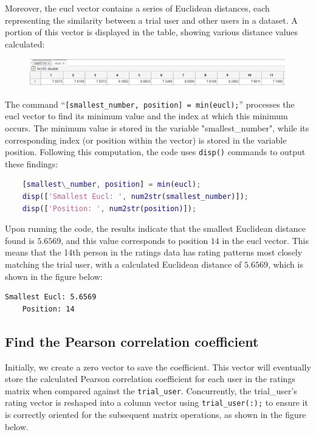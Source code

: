Moreover, the eucl vector contains a series of Euclidean distances, each representing the similarity between a trial user and other users in a dataset. A portion of this vector is displayed in the table, showing various distance values calculated:

\begin{figure}[H]
	\centering
	\includegraphics[width=\linewidth]{sections/pic/section3/3.png}
\end{figure}

The command “\texttt{[smallest\_number, position] = min(eucl);}” processes the eucl vector to find its minimum value and the index at which this minimum occurs. The minimum value is stored in the variable "smallest\_number", while its corresponding index (or position within the vector) is stored in the variable position. Following this computation, the code uses \texttt{disp()} commands to output these findings:

\begin{lstlisting}[style=StyleCode, language=MATLAB]
	% Find the smallest Euclidean distance
	[smallest\_number, position] = min(eucl);
	disp(['Smallest Eucl: ', num2str(smallest_number)]);
	disp(['Position: ', num2str(position)]);
\end{lstlisting}

Upon running the code, the results indicate that the smallest Euclidean distance found is $5.6569$, and this value corresponds to position $14$ in the eucl vector. This means that the 14th person in the ratings data has rating patterns most closely matching the trial user, with a calculated Euclidean distance of $5.6569$, which is shown in the figure below:

\begin{lstlisting}[style=StyleResult]
	Smallest Eucl: 5.6569
	Position: 14
\end{lstlisting}

\subsection{Find the Pearson correlation coefficient}

Initially, we create a zero vector to save the coefficient. This vector will eventually store the calculated Pearson correlation coefficient for each user in the ratings matrix when compared against the \texttt{trial\_user}. Concurrently, the trial\_user's rating vector is reshaped into a column vector using \texttt{trial\_user(:);} to ensure it is correctly oriented for the subsequent matrix operations, as shown in the figure below.
	
